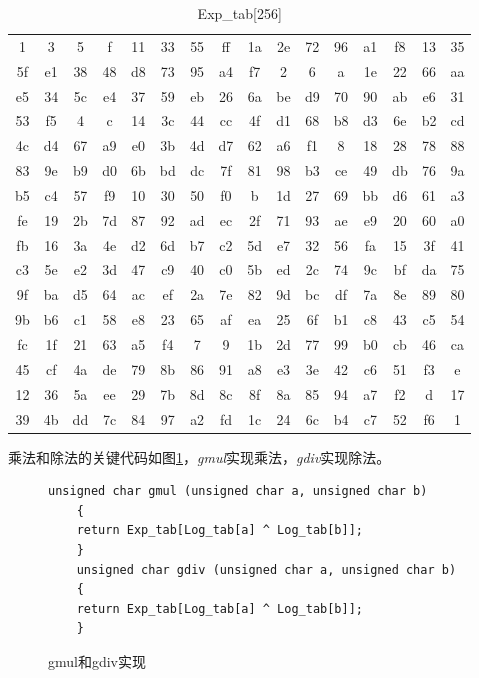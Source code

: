 \begin{table}[htb]
	\caption{Exp\_tab[256]}
	\centering
	\begin{tabular}{cccccccccccccccc}
		\toprule
 1& 3& 5& f&11&33&55&ff&1a&2e&72&96&a1&f8&13&35\\
5f&e1&38&48&d8&73&95&a4&f7& 2& 6& a&1e&22&66&aa\\
e5&34&5c&e4&37&59&eb&26&6a&be&d9&70&90&ab&e6&31\\
53&f5& 4& c&14&3c&44&cc&4f&d1&68&b8&d3&6e&b2&cd\\
4c&d4&67&a9&e0&3b&4d&d7&62&a6&f1& 8&18&28&78&88\\
83&9e&b9&d0&6b&bd&dc&7f&81&98&b3&ce&49&db&76&9a\\
b5&c4&57&f9&10&30&50&f0& b&1d&27&69&bb&d6&61&a3\\
fe&19&2b&7d&87&92&ad&ec&2f&71&93&ae&e9&20&60&a0\\
fb&16&3a&4e&d2&6d&b7&c2&5d&e7&32&56&fa&15&3f&41\\
c3&5e&e2&3d&47&c9&40&c0&5b&ed&2c&74&9c&bf&da&75\\
9f&ba&d5&64&ac&ef&2a&7e&82&9d&bc&df&7a&8e&89&80\\
9b&b6&c1&58&e8&23&65&af&ea&25&6f&b1&c8&43&c5&54\\
fc&1f&21&63&a5&f4& 7& 9&1b&2d&77&99&b0&cb&46&ca\\
45&cf&4a&de&79&8b&86&91&a8&e3&3e&42&c6&51&f3& e\\
12&36&5a&ee&29&7b&8d&8c&8f&8a&85&94&a7&f2& d&17\\
39&4b&dd&7c&84&97&a2&fd&1c&24&6c&b4&c7&52&f6& 1\\
		\bottomrule
	\end{tabular}
	\label{Exptab}
\end{table}
乘法和除法的关键代码如图\ref{GCAL}，\emph{gmul}实现乘法，\emph{gdiv}实现除法。
\begin{figure}

	\begin{lstlisting}[language={[ANSI]C}]
	unsigned char gmul (unsigned char a, unsigned char b)
	{
	return Exp_tab[Log_tab[a] ^ Log_tab[b]];
	}
	unsigned char gdiv (unsigned char a, unsigned char b)
	{
	return Exp_tab[Log_tab[a] ^ Log_tab[b]];
	}
	\end{lstlisting}
	\caption{gmul和gdiv实现}
	\label{GCAL}
\end{figure}

